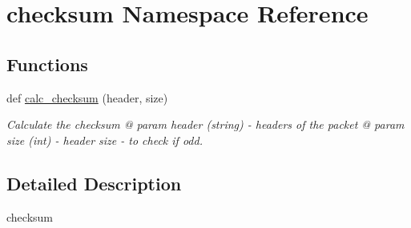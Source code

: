 \hypertarget{namespacechecksum}{}\section{checksum Namespace Reference}
\label{namespacechecksum}
\subsection*{Functions}
\begin{DoxyCompactItemize}
\item 
\mbox{\label{namespacechecksum_a56e8f2be9605fe0527caf6e7f1d931e7}} 
def \hyperlink{namespacechecksum_a56e8f2be9605fe0527caf6e7f1d931e7}{calc\+\_\+checksum} (header, size)
\begin{DoxyCompactList}\small\item\em Calculate the checksum @ param header (string) -\/ headers of the packet @ param size (int) -\/ header size -\/ to check if odd. \end{DoxyCompactList}\end{DoxyCompactItemize}


\subsection{Detailed Description}
\begin{DoxyVerb}checksum \end{DoxyVerb}
 